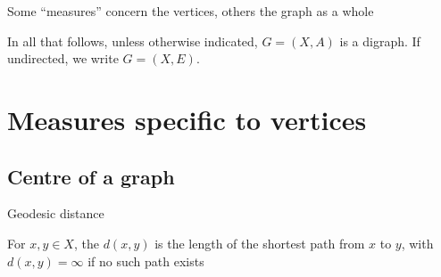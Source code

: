 \documentclass[aspectratio=43]{beamer}
\begin{document}
\begin{frame}
	Some ``measures'' concern the vertices, others the graph as a whole
	
	In all that follows, unless otherwise indicated, $G=(X,A)$ is a digraph. If undirected, we write $G=(X,E)$.
\end{frame}

\section{Measures specific to vertices}


\subsection{Centre of a graph}

\begin{frame}{Geodesic distance}
\begin{definition}
For $x,y\in X$, the  $d(x,y)$ is the length of the shortest path from $x$ to $y$, with $d(x,y)=\infty$ if no such path exists
\end{definition}
\end{frame}
\end{document}
